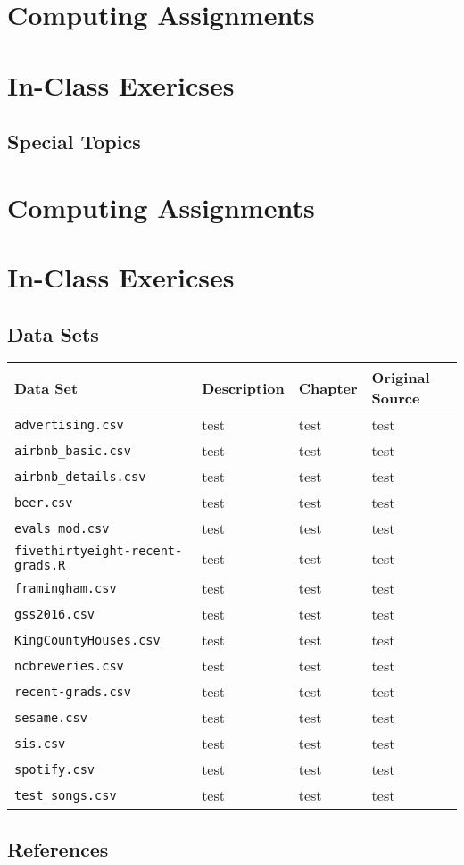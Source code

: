 \documentclass[]{book}
\begin{document}
\part*{Computing
Assignments}\label{part-computing-assignments-4}

\part*{In-Class Exericses}\label{part-in-class-exericses-2}

\chapter{Special Topics}\label{special}

\part*{Computing
Assignments}\label{part-computing-assignments-5}

\part*{In-Class Exericses}\label{part}

\chapter{Data Sets}\label{data}

\begin{longtable}[]{@{}llll@{}}
\toprule
Data Set & Description & Chapter & Original Source\tabularnewline
\midrule
\endhead
\texttt{advertising.csv} & test & test & test\tabularnewline
\texttt{airbnb\_basic.csv} & test & test & test\tabularnewline
\texttt{airbnb\_details.csv} & test & test & test\tabularnewline
\texttt{beer.csv} & test & test & test\tabularnewline
\texttt{evals\_mod.csv} & test & test & test\tabularnewline
\texttt{fivethirtyeight-recent-grads.R} & test & test &
test\tabularnewline
\texttt{framingham.csv} & test & test & test\tabularnewline
\texttt{gss2016.csv} & test & test & test\tabularnewline
\texttt{KingCountyHouses.csv} & test & test & test\tabularnewline
\texttt{ncbreweries.csv} & test & test & test\tabularnewline
\texttt{recent-grads.csv} & test & test & test\tabularnewline
\texttt{sesame.csv} & test & test & test\tabularnewline
\texttt{sis.csv} & test & test & test\tabularnewline
\texttt{spotify.csv} & test & test & test\tabularnewline
\texttt{test\_songs.csv} & test & test & test\tabularnewline
\bottomrule
\end{longtable}

\chapter{References}\label{refs}


\end{document}
